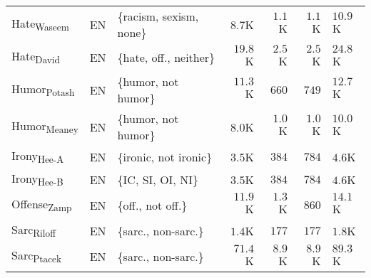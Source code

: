 \begin{table}[h]
{\begin{tabular}{@{}lclrrrH@{}}
Hate\textsubscript{Waseem}%
& EN  & \{racism, sexism, none\}                                        & $8.7$K                              & $1.1$K                            & $1.1$K                             & $10.9$K                             \\
Hate\textsubscript{David}%
& EN & \{hate, off., neither\}                                    & $19.8$K                             & $2.5$K                            & $2.5$K                            & $24.8$K                            \\
Humor\textsubscript{Potash}%
& EN & \{humor, not humor\}                          & $11.3$K                             & $660$                              & $749$                               & $12.7$K                             \\
Humor\textsubscript{Meaney}%
& EN &                     \{humor, not humor\}                                             & $8.0$K                             & $1.0$K                              & $1.0$K                             & $10.0$K                             \\
Irony\textsubscript{Hee-A}%
& EN & \{ironic, not ironic\}                                          & $3.5$K                             & $384$                              & $784$                               & $4.6$K                             \\
Irony\textsubscript{Hee-B}%
& EN & \{IC, SI, OI, NI\} & $3.5$K                              & $384$                              & $784$                               & $4.6$K                              \\
Offense\textsubscript{Zamp}%
& EN & \{off., not off.\}                                   & $11.9$K                             & $1.3$K                           & $860$                               & $14.1$K                            \\
Sarc\textsubscript{Riloff}%
& EN & \{sarc., non-sarc.\}                   & $1.4$K                             & $177$                              & $177$                               &$1.8$K                             \\
Sarc\textsubscript{Ptacek}%
& EN &    \{sarc., non-sarc.\}                                                              & $71.4$K                             & $8.9$K                            & $8.9$K                             & $89.3$K                          \\

\end{tabular}}
\end{table}
